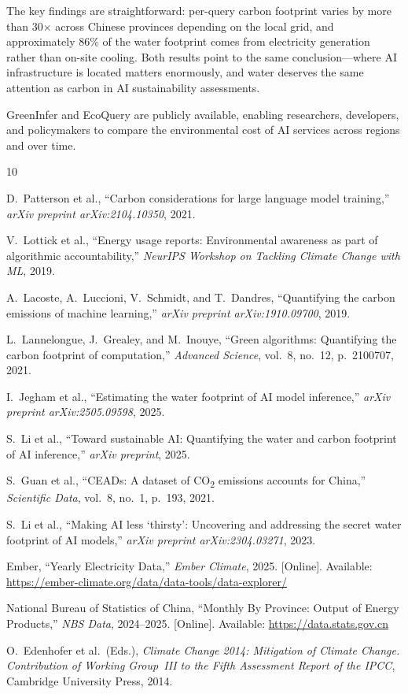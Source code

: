 \documentclass[11pt,a4paper]{article}
\begin{document}
The key findings are straightforward: per-query carbon footprint varies by
more than 30$\times$ across Chinese provinces depending on the local grid,
and approximately 86\% of the water footprint comes from electricity generation rather
than on-site cooling. Both results point to the same conclusion---where AI
infrastructure is located matters enormously, and water deserves the same
attention as carbon in AI sustainability assessments.

GreenInfer and EcoQuery are publicly available, enabling researchers,
developers, and policymakers to compare the environmental cost of AI
services across regions and over time.

\begin{thebibliography}{10}

D.~Patterson et al.,
``Carbon considerations for large language model training,''
\emph{arXiv preprint arXiv:2104.10350}, 2021.

V.~Lottick et al.,
``Energy usage reports: Environmental awareness as part of algorithmic
accountability,''
\emph{NeurIPS Workshop on Tackling Climate Change with ML}, 2019.

A.~Lacoste, A.~Luccioni, V.~Schmidt, and T.~Dandres,
``Quantifying the carbon emissions of machine learning,''
\emph{arXiv preprint arXiv:1910.09700}, 2019.

L.~Lannelongue, J.~Grealey, and M.~Inouye,
``Green algorithms: Quantifying the carbon footprint of computation,''
\emph{Advanced Science}, vol.~8, no.~12, p.~2100707, 2021.

I.~Jegham et al.,
``Estimating the water footprint of AI model inference,''
\emph{arXiv preprint arXiv:2505.09598}, 2025.

S.~Li et al.,
``Toward sustainable AI: Quantifying the water and carbon footprint
of AI inference,''
\emph{arXiv preprint}, 2025.

S.~Guan et al.,
``CEADs: A dataset of CO\textsubscript{2} emissions accounts for China,''
\emph{Scientific Data}, vol.~8, no.~1, p.~193, 2021.

S.~Li et al.,
``Making AI less `thirsty': Uncovering and addressing the secret water
footprint of AI models,''
\emph{arXiv preprint arXiv:2304.03271}, 2023.

Ember,
``Yearly Electricity Data,''
\emph{Ember Climate}, 2025.
[Online]. Available: \url{https://ember-climate.org/data/data-tools/data-explorer/}

National Bureau of Statistics of China,
``Monthly By Province: Output of Energy Products,''
\emph{NBS Data}, 2024--2025.
[Online]. Available: \url{https://data.stats.gov.cn}

O.~Edenhofer et al.\ (Eds.),
\emph{Climate Change 2014: Mitigation of Climate Change.
Contribution of Working Group~III to the Fifth Assessment Report of the IPCC},
Cambridge University Press, 2014.

\end{thebibliography}
\end{document}
